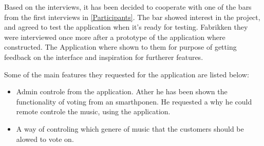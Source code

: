 Based on the interviews, it has been decided to cooperate with one of the bars from the first interviews in \cref{Participants}. The bar showed interest in the project, and agreed to test the application when it's ready for testing. 
Fabrikken they were interviewed once more after a prototype of the application where constructed. The Application where shown to them for purpose of getting feedback on the interface and inspiration for furtherer features.

Some of the main features they requested for the application are listed below:

\begin{itemize}
	\item Admin controle from the application. Ather he has been shown the functionality of voting from an smarthponen. He requested a why he could remote controle the music, using the application. 
	\item A way of controling which genere of music that the customers should be alowed to vote on. 
\end{itemize}


